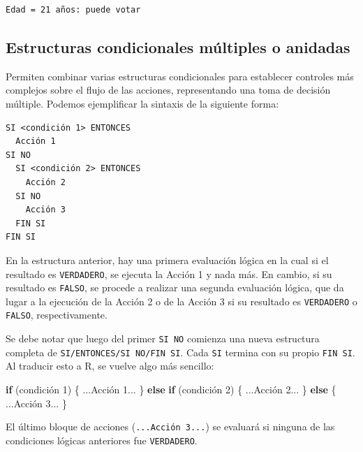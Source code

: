 \documentclass[
]{book}
\newenvironment{Shaded}{\begin{snugshade}}{\end{snugshade}}
\newcommand{\ControlFlowTok}[1]{\textcolor[rgb]{0.13,0.29,0.53}{\textbf{#1}}}
\newcommand{\DecValTok}[1]{\textcolor[rgb]{0.00,0.00,0.81}{#1}}
\newcommand{\NormalTok}[1]{#1}
\begin{document}
\begin{verbatim}
Edad = 21 años: puede votar
\end{verbatim}

\hypertarget{estructuras-condicionales-muxfaltiples-o-anidadas}{%
\subsection{Estructuras condicionales múltiples o anidadas}\label{estructuras-condicionales-muxfaltiples-o-anidadas}}

Permiten combinar varias estructuras condicionales para establecer controles más complejos sobre el flujo de las acciones, representando una toma de decisión múltiple. Podemos ejemplificar la sintaxis de la siguiente forma:

\begin{verbatim}
SI <condición 1> ENTONCES
  Acción 1
SI NO
  SI <condición 2> ENTONCES
    Acción 2
  SI NO
    Acción 3
  FIN SI
FIN SI
\end{verbatim}

En la estructura anterior, hay una primera evaluación lógica en la cual si el resultado es \texttt{VERDADERO}, se ejecuta la Acción 1 y nada más. En cambio, si su resultado es \texttt{FALSO}, se procede a realizar una segunda evaluación lógica, que da lugar a la ejecución de la Acción 2 o de la Acción 3 si su resultado es \texttt{VERDADERO} o \texttt{FALSO}, respectivamente.

Se debe notar que luego del primer \texttt{SI\ NO} comienza una nueva estructura completa de \texttt{SI/ENTONCES/SI\ NO/FIN\ SI}. Cada \texttt{SI} termina con su propio \texttt{FIN\ SI}. Al traducir esto a R, se vuelve algo más sencillo:

\begin{Shaded}
\begin{Highlighting}[]
\ControlFlowTok{if}\NormalTok{ (condición }\DecValTok{1}\NormalTok{) \{}
\NormalTok{    ...Acción }\DecValTok{1}\NormalTok{...}
\NormalTok{\} }\ControlFlowTok{else} \ControlFlowTok{if}\NormalTok{ (condición }\DecValTok{2}\NormalTok{) \{}
\NormalTok{    ...Acción }\DecValTok{2}\NormalTok{...}
\NormalTok{\} }\ControlFlowTok{else}\NormalTok{ \{}
\NormalTok{    ...Acción }\DecValTok{3}\NormalTok{...}
\NormalTok{\}}
\end{Highlighting}
\end{Shaded}

El último bloque de acciones (\texttt{...Acción\ 3...}) se evaluará si ninguna de las condiciones lógicas anteriores fue \texttt{VERDADERO}.
\end{document}
